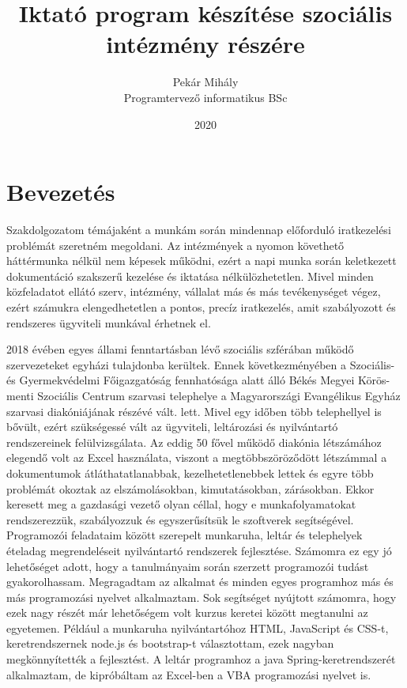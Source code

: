 \documentclass[
]{thesis-ekf}
\theoremstyle{definition}
\theoremstyle{remark}
\begin{document}
\title{Iktató program készítése szociális intézmény részére}
\author{Pekár Mihály\\Programtervező informatikus BSc}
\date{2020}
\maketitle
\tableofcontents
\chapter{Bevezetés}

Szakdolgozatom témájaként a munkám során mindennap előforduló iratkezelési problémát szeretném megoldani. Az intézmények a nyomon követhető háttérmunka nélkül nem képesek működni, ezért a napi munka során keletkezett dokumentáció szakszerű kezelése és iktatása nélkülözhetetlen. Mivel minden közfeladatot ellátó szerv, intézmény, vállalat más és más tevékenységet végez, ezért számukra elengedhetetlen a pontos, precíz iratkezelés, amit szabályozott és rendszeres ügyviteli munkával érhetnek el.

2018 évében egyes állami fenntartásban lévő szociális szférában működő szervezeteket egyházi tulajdonba kerültek. Ennek következményében a Szociális- és Gyermekvédelmi Főigazgatóság fennhatósága alatt álló Békés Megyei Körös-menti Szociális Centrum szarvasi telephelye a Magyarországi Evangélikus Egyház szarvasi diakóniájának részévé vált. lett. Mivel egy időben több telephellyel is bővült, ezért szükségessé vált az ügyviteli, leltározási és nyilvántartó rendszereinek felülvizsgálata. Az eddig 50 fővel működő diakónia létszámához elegendő volt az Excel használata, viszont a megtöbbszöröződött létszámmal a dokumentumok átláthatatlanabbak, kezelhetetlenebbek lettek és egyre több problémát okoztak az elszámolásokban, kimutatásokban, zárásokban. Ekkor keresett meg a gazdasági vezető olyan céllal, hogy e munkafolyamatokat rendszerezzük, szabályozzuk és egyszerűsítsük le szoftverek segítségével. Programozói feladataim között szerepelt munkaruha, leltár és telephelyek ételadag megrendeléseit nyilvántartó rendszerek fejlesztése. Számomra ez egy jó lehetőséget adott, hogy a tanulmányaim során szerzett programozói tudást gyakorolhassam. Megragadtam az alkalmat és minden egyes programhoz más és más programozási nyelvet alkalmaztam. Sok segítséget nyújtott számomra, hogy ezek nagy részét már lehetőségem volt kurzus keretei között megtanulni az egyetemen. Például a munkaruha nyilvántartóhoz HTML, JavaScript és CSS-t, keretrendszernek node.js és bootstrap-t választottam, ezek nagyban megkönnyítették a fejlesztést. A leltár programhoz a java Spring-keretrendszerét alkalmaztam, de kipróbáltam az Excel-ben a VBA programozási nyelvet is.
\end{document}

